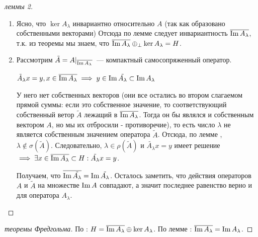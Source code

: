 \begin{proof}[леммы 2]
    \begin{enumerate}
        \item Ясно, что $\ker A_{\lambda}$ инвариантно относительно $A$ (так как образовано собственными векторами) %
        Отсюда по лемме  следует инвариантность $\overline{\operatorname{Im} A_\lambda}$, т.к. из теоремы  мы знаем, что $\overline{\operatorname{Im} A_{\lambda}} \oplus_{\perp} \ker A_{\lambda} = H$.
        \item Рассмотрим $\tilde{A}=A|_{\overline{\operatorname{Im} A_\lambda}}$~--- компактный самосопряженный оператор. 
        
        $\tilde{A}_\lambda x = y, x \in \overline{\operatorname{Im} A_\lambda} \implies y \in \operatorname{Im} \tilde{A_\lambda} \subset \operatorname{Im} A_\lambda$
        
        У него нет собственных векторов (они все остались во втором слагаемом прямой суммы: если это собственное значение, то соответствующий собственный ветор $\tilde{A}$ лежащий в $\overline{\operatorname{Im} A_\lambda}$. Тогда он бы являлся и собственным вектором $A$, но мы их отбросили - противоречие), то есть число $\lambda$ не является собственным значением оператора $\tilde{A}$. Отсюда, по лемме , $\lambda \not\in \sigma(\tilde{A})$. Следовательно, $\lambda \in \rho(\tilde{A})$ и $\tilde{A_\lambda}x=y$ имеет решение $\implies \exists x \in \overline{\operatorname{Im} A_\lambda} \subset H: \tilde{A_\lambda}x=y$.
        
        Получаем, что $\overline{\operatorname{Im} \tilde{A_{\lambda}}} = \operatorname{Im} \tilde{A_{\lambda}}$.
        Осталось заметить, что действия операторов $A$ и $\tilde{A}$ на множестве $\operatorname{Im} A$ совпадают, а значит последнее равенство верно и для оператора $A_{\lambda}$.
    \end{enumerate}
\end{proof}

\begin{proof}[теоремы Фредгольма]
    По : $H=\overline{\operatorname{Im} A_\lambda} \oplus \ker A_\lambda$. По лемме : $\overline{\operatorname{Im} A_\lambda} = \operatorname{Im} A_\lambda$.
\end{proof}

